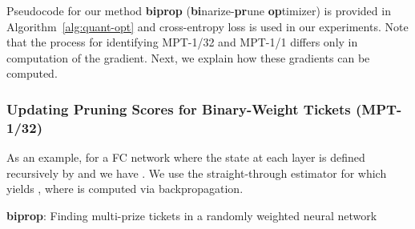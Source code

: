 \documentclass{article} \usepackage{iclr2021_conference,times}
\begin{document}
Pseudocode for our method \textbf{biprop} (\textbf{bi}narize-\textbf{pr}une \textbf{op}timizer) is provided in Algorithm~\ref{alg:quant-opt} and cross-entropy loss is used in our experiments. Note that the process for identifying MPT-1/32 and MPT-1/1 differs only in computation of the gradient. Next, we explain how these gradients can be computed.  









\subsubsection{Updating Pruning Scores for Binary-Weight Tickets (MPT-1/32)} \label{sec:biprop-1-32}
As an example, for a FC network where the state at each layer is defined recursively by  and  we have . We use the straight-through estimator \citep{bengio2013estimating} for  which yields , where  is computed via backpropagation.







\begin{algorithm}[t!]
\begin{algorithmic}[1] 
 \vspace{1mm}
 \vspace{0.5mm}  \vspace{1mm}
  \vspace{1mm}
 \vspace{1mm}
\ENDFOR
{}
\end{algorithmic}
\caption{\textbf{biprop}: Finding multi-prize tickets in a randomly weighted neural network}
\label{alg:quant-opt}
\end{algorithm}
\end{document}
